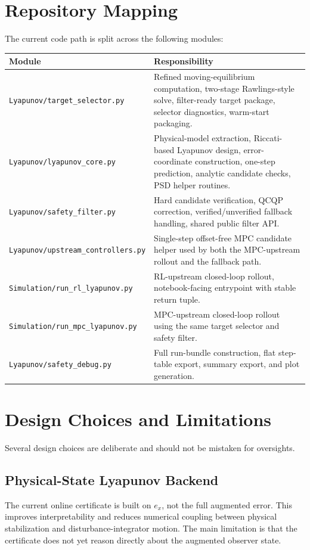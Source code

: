 \documentclass[11pt]{article}
\begin{document}
\section{Repository Mapping}
The current code path is split across the following modules:
\begin{center}
\begin{tabular}{>{\raggedright\arraybackslash}p{} >{\raggedright\arraybackslash}p{}}
\toprule
Module & Responsibility \\
\midrule
\texttt{Lyapunov/target\_selector.py} & Refined moving-equilibrium computation, two-stage Rawlings-style solve, filter-ready target package, selector diagnostics, warm-start packaging. \\
\texttt{Lyapunov/lyapunov\_core.py} & Physical-model extraction, Riccati-based Lyapunov design, error-coordinate construction, one-step prediction, analytic candidate checks, PSD helper routines. \\
\texttt{Lyapunov/safety\_filter.py} & Hard candidate verification, QCQP correction, verified/unverified fallback handling, shared public filter API. \\
\texttt{Lyapunov/upstream\_controllers.py} & Single-step offset-free MPC candidate helper used by both the MPC-upstream rollout and the fallback path. \\
\texttt{Simulation/run\_rl\_lyapunov.py} & RL-upstream closed-loop rollout, notebook-facing entrypoint with stable return tuple. \\
\texttt{Simulation/run\_mpc\_lyapunov.py} & MPC-upstream closed-loop rollout using the same target selector and safety filter. \\
\texttt{Lyapunov/safety\_debug.py} & Full run-bundle construction, flat step-table export, summary export, and plot generation. \\
\bottomrule
\end{tabular}
\end{center}

\section{Design Choices and Limitations}
Several design choices are deliberate and should not be mistaken for oversights.

\subsection{Physical-State Lyapunov Backend}
The current online certificate is built on $e_x$, not the full augmented error. This improves interpretability and reduces numerical coupling between physical stabilization and disturbance-integrator motion. The main limitation is that the certificate does not yet reason directly about the augmented observer state.
\end{document}
